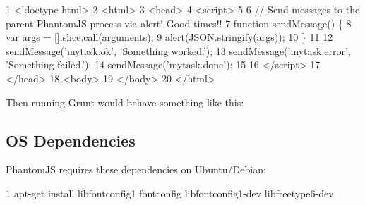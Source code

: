 \begin{DoxyCode}
1 <!doctype html>
2 <html>
3 <head>
4 <script>
5 
6 // Send messages to the parent PhantomJS process via alert! Good times!!
7 function sendMessage() \{
8   var args = [].slice.call(arguments);
9   alert(JSON.stringify(args));
10 \}
11 
12 sendMessage('mytask.ok', 'Something worked.');
13 sendMessage('mytask.error', 'Something failed.');
14 sendMessage('mytask.done');
15 
16 </script>
17 </head>
18 <body>
19 </body>
20 </html>
\end{DoxyCode}


Then running Grunt would behave something like this\+:




\subsection*{O\+S Dependencies}

Phantom\+J\+S requires these dependencies on Ubuntu/\+Debian\+:


\begin{DoxyCode}
1 apt-get install libfontconfig1 fontconfig libfontconfig1-dev libfreetype6-dev
\end{DoxyCode}
 